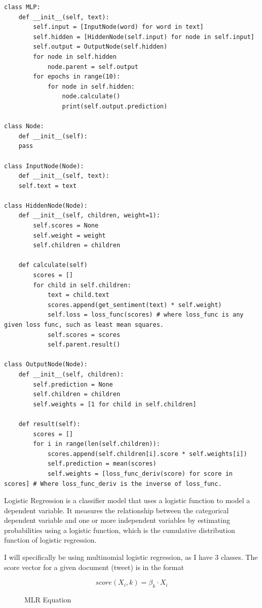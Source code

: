 \documentclass{article}
\begin{document}
\begin{lstlisting}[caption={Multilayer Perceptron classifier psuedopythoncode},captionpos=b]
class MLP:
	def __init__(self, text):
		self.input = [InputNode(word) for word in text]
		self.hidden = [HiddenNode(self.input) for node in self.input]
		self.output = OutputNode(self.hidden)
		for node in self.hidden
			node.parent = self.output
		for epochs in range(10):
			for node in self.hidden:
				node.calculate()
				print(self.output.prediction)

class Node:
	def __init__(self):
	pass

class InputNode(Node):
	def __init__(self, text):
	self.text = text

class HiddenNode(Node):
	def __init__(self, children, weight=1):
		self.scores = None
		self.weight = weight
		self.children = children

	def calculate(self)
		scores = []
		for child in self.children:
			text = child.text
			scores.append(get_sentiment(text) * self.weight)
			self.loss = loss_func(scores) # where loss_func is any given loss func, such as least mean squares.
			self.scores = scores
			self.parent.result()

class OutputNode(Node):
	def __init__(self, children):
		self.prediction = None
		self.children = children
		self.weights = [1 for child in self.children]

	def result(self):
		scores = []
		for i in range(len(self.children)):
			scores.append(self.children[i].score * self.weights[i])
			self.prediction = mean(scores)
			self.weights = [loss_func_deriv(score) for score in scores] # Where loss_func_deriv is the inverse of loss_func.
\end{lstlisting}

Logistic Regression is a classifier model that uses a logistic function to model a dependent variable.
It measures the relationship between the categorical dependent variable and one or more independent variables by estimating probabilities using a logistic function, which is the cumulative distribution function of logistic regression.

I will specifically be using multinomial logistic regression, as I have 3 classes.
The score vector for a given document (tweet) is in the format

\begin{figure}[H]
	\begin{equation}
		score(X_i, k) = \beta_k \cdot X_i
	\end{equation}
	\caption{MLR Equation}
\end{figure}
\end{document}
